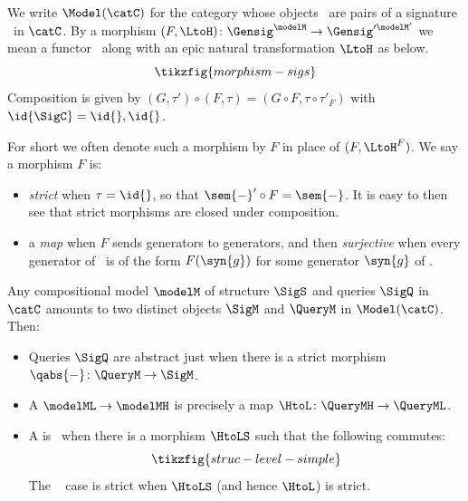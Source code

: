 \documentclass{article}
\begin{document}
{

\begin{definition}
We write $\Model(\catC)$ for the category whose objects \rl{$\Gensig^{\modelM}$}\ are pairs of a signature \ in $\catC$. By a morphism $(F,\LtoH) \colon \Gensig^\modelM \to \Gensig'^{\modelM'}$ we mean a functor \ along with an epic natural transformation $\LtoH$ as below. 
\[
\tikzfig{morphism-sigs}
\]
Composition is given by $(G, \tau') \circ (F, \tau) = (G \circ F, \tau \circ \tau'_F)$ with $\id{\SigC} = {\id{}, \id{}}$.  
\end{definition}

For short we often denote such a morphism by $F$ in place of $(F,\LtoH^F)$. We say a morphism $F$ is: 
\begin{itemize}
\item 
\emph{strict} when $\tau=\id{}$, so that $\sem{-}' \circ F = \sem{-}$. It is easy to then see that strict morphisms are closed under composition. 

\item 
 a \emph{map} when $F$ sends generators to generators, and then \emph{surjective} when every generator of \ is of the form $F(\syn{g})$ for some generator $\syn{g}$ of \rl{$\Gensigcat$}. 
\end{itemize}

Any compositional model $\modelM$ of structure $\SigS$ and queries $\SigQ$ in $\catC$ amounts to two distinct objects $\SigM$ and $\QueryM$ in $\Model(\catC)$. Then:
\begin{itemize}
\item 
Queries $\SigQ$ are abstract just when there is a strict morphism $\qabs{-} \colon \QueryM \to \SigM$. 

\item 
A \qdown{} $\modelML \to \modelMH$ is precisely a map $\HtoL \colon \QueryMH\to \QueryML$. 

\item 
A \qdown{} is \rl{\strucdownprop}\ when there is a morphism $\HtoLS$ such that the following commutes: 
\[
\tikzfig{struc-level-simple}
\]
The \rl{\strucdownprop}\ \qdown{} case is strict when $\HtoLS$ (and hence $\HtoL$) is strict. 
\end{itemize} 

}
\end{document}
